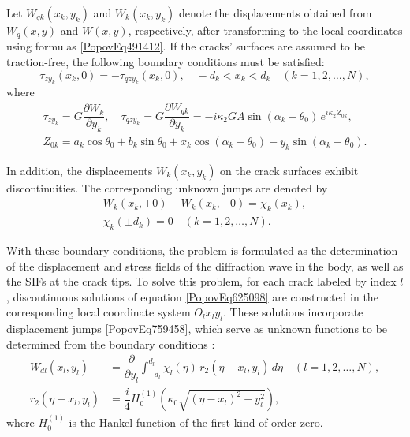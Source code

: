 Let \( W_{qk}(x_k, y_k) \) and \( W_k(x_k, y_k) \) denote the displacements obtained from \( W_q(x, y) \) and \( W(x, y) \), respectively, after transforming to the local coordinates using formulas \eqref{PopovEq491412}. If the cracks' surfaces are assumed to be traction-free, the following boundary conditions must be satisfied:
\begin{equation} \label{PopovEq757980} 
	\tau_{z y_k}(x_k, 0) = -\tau_{q z y_k}(x_k, 0), \quad -d_k < x_k < d_k \quad (k = 1, 2, \dots, N),
\end{equation}
where
\[
\begin{array}{l} 
	\tau_{z y_k} = G \dfrac{\partial W_k}{\partial y_k}, \quad 
	\tau_{q z y_k} = G \dfrac{\partial W_{qk}}{\partial y_k} = -i \kappa_2 G A \sin(\alpha_k - \theta_0)\, e^{i \kappa_2 Z_{0k}}, 
	\\[0.8em]
	Z_{0k} = a_k \cos \theta_0 + b_k \sin \theta_0 + x_k \cos(\alpha_k - \theta_0) - y_k \sin(\alpha_k - \theta_0).
\end{array}
\]

In addition, the displacements \( W_k(x_k, y_k) \) on the crack surfaces exhibit discontinuities. The corresponding unknown jumps are denoted by
\begin{equation} \label{PopovEq759458} 
	\begin{array}{l}
		W_k(x_k, +0) - W_k(x_k, -0) = \chi_k(x_k),
		\\[0.5em]
		\chi_k(\pm d_k) = 0 \quad (k = 1, 2, \dots, N).
	\end{array}
\end{equation}

With these boundary conditions, the problem is formulated as the determination of the displacement and stress fields of the diffraction wave in the body, as well as the SIFs at the crack tips. To solve this problem, for each crack labeled by index \( l \), discontinuous solutions of equation \eqref{PopovEq625098} are constructed in the corresponding local coordinate system \( O_l x_l y_l \). These solutions incorporate displacement jumps \eqref{PopovEq759458}, which serve as unknown functions to be determined from the boundary conditions \cite{Popov15, Popov17}:
\begin{equation} \label{PopovEq185484} 
	\begin{aligned} 
		W_{d l}(x_l, y_l) &= \dfrac{\partial}{\partial y_l} \int_{-d_l}^{d_l} \chi_l(\eta)\, r_2(\eta - x_l, y_l)\, d\eta \quad (l = 1, 2, \dots, N), 
		\\[0.8em]
		r_2(\eta - x_l, y_l) &= \dfrac{i}{4} H_0^{(1)}\left(\kappa_0 \sqrt{(\eta - x_l)^2 + y_l^2}\right),
	\end{aligned} 
\end{equation}
where \( H_0^{(1)} \) is the Hankel function of the first kind of order zero.

